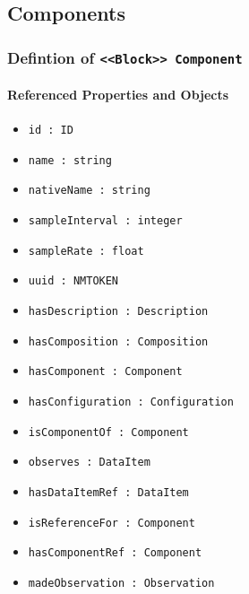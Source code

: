 \subsection{Components} \label{model:Components}
\subsubsection{Defintion of \texttt{<<Block>> Component}}
  \label{type:Component}

\FloatBarrier



\FloatBarrier
\paragraph{Referenced Properties and Objects}

\begin{itemize}
\item \texttt{id : ID}

\item \texttt{name : string}

\item \texttt{nativeName : string}

\item \texttt{sampleInterval : integer}

\item \texttt{sampleRate : float}

\item \texttt{uuid : NMTOKEN}

\item \texttt{hasDescription : Description}

\item \texttt{hasComposition : Composition}

\item \texttt{hasComponent : Component}

\item \texttt{hasConfiguration : Configuration}

\item \texttt{isComponentOf : Component}

\item \texttt{observes : DataItem}

\item \texttt{hasDataItemRef : DataItem}

\item \texttt{isReferenceFor : Component}

\item \texttt{hasComponentRef : Component}

\item \texttt{madeObservation : Observation}

\end{itemize}
\FloatBarrier
